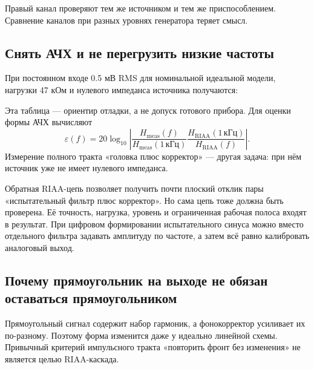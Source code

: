 \documentclass[a4paper,11pt]{article}
\begin{document}
Правый канал проверяют тем же источником и тем же приспособлением.
Сравнение каналов при разных уровнях генератора теряет смысл.

\subsection{Снять АЧХ и не перегрузить низкие частоты}

При постоянном входе 0.5 мВ RMS для номинальной идеальной модели,
нагрузки 47 кОм и нулевого импеданса источника получаются:
\begin{center}
\end{center}
Эта таблица — ориентир отладки, а не допуск готового прибора.
Для оценки формы АЧХ вычисляют
\[
 \varepsilon(f)=20\log_{10}\left|
 \frac{H_{\mathrm{meas}}(f)}{H_{\mathrm{meas}}(1\,\text{кГц})}
 \frac{H_{\mathrm{RIAA}}(1\,\text{кГц})}{H_{\mathrm{RIAA}}(f)}\right|.
\]
Измерение полного тракта «головка плюс корректор» — другая задача:
при нём источник уже не имеет нулевого импеданса.

Обратная RIAA-цепь позволяет получить почти плоский отклик пары
«испытательный фильтр плюс корректор». Но сама цепь тоже должна быть проверена.
Её точность, нагрузка, уровень и ограниченная рабочая полоса входят в результат.
При цифровом формировании испытательного синуса можно вместо отдельного фильтра
задавать амплитуду по частоте, а затем всё равно калибровать аналоговый выход.

\subsection{Почему прямоугольник на выходе не обязан оставаться прямоугольником}

Прямоугольный сигнал содержит набор гармоник, а фонокорректор усиливает их
по-разному. Поэтому форма изменится даже у идеально линейной схемы.
Привычный критерий импульсного тракта «повторить фронт без изменения»
не является целью RIAA-каскада.
\end{document}
